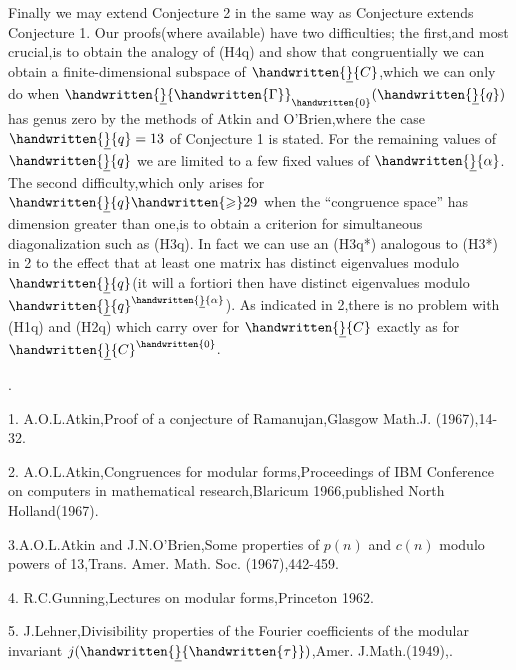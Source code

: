 Finally we may extend Conjecture 2 in the same way as Conjecture  extends Conjecture 1. Our proofs(where available) have two difficulties; the first,and most crucial,is to obtain the analogy of (H4q) and show that congruentially we can obtain a finite-dimensional subspace of $\handwritten{\underline}{C}$,which we can only do when $\handwritten{\underline}{\handwritten{\Gamma}}_{\handwritten{0}}(\handwritten{\underline}{q})$ has genus zero by the methods of Atkin and O'Brien,where the case $\handwritten{\underline}{q}=13$ of Conjecture 1 is stated. For the remaining values of $\handwritten{\underline}{q}$ we are limited to a few fixed values of $\handwritten{\underline}{\alpha}$. The second difficulty,which only arises for $\handwritten{\underline}{q}\handwritten{\geqslant}29$ when the ``congruence space'' has dimension greater than one,is to obtain a criterion for simultaneous diagonalization such as (H3q). In fact we can use an (H3q*) analogous to (H3*) in \handwritten{\S}2 to the effect that at least one matrix has distinct eigenvalues modulo $\handwritten{\underline}{q}$(it will a fortiori then have distinct eigenvalues modulo $\handwritten{\underline}{q}^{\handwritten{\underline}{\alpha}}$). As indicated in \handwritten{\S}2,there is no problem with (H1q) and (H2q) which carry over for $\handwritten{\underline}{C}$ exactly as for $\handwritten{\underline}{C}^{\handwritten{0}}$.

.

1. A.O.L.Atkin,Proof of a conjecture of Ramanujan,Glasgow Math.J. (1967),14-32.

2. A.O.L.Atkin,Congruences for modular forms,Proceedings of IBM Conference on computers in mathematical research,Blaricum 1966,published North Holland(1967).

3.A.O.L.Atkin and J.N.O'Brien,Some properties of $p(n)$ and $c(n)$ modulo powers of 13,Trans. Amer. Math. Soc. (1967),442-459.

4. R.C.Gunning,Lectures on modular forms,Princeton 1962.

5. J.Lehner,Divisibility properties of the Fourier coefficients of the modular invariant $j(\handwritten{\underline}{\handwritten{\tau}})$,Amer. J.Math.(1949),.\reversemarginpar{}\normalmarginpar

